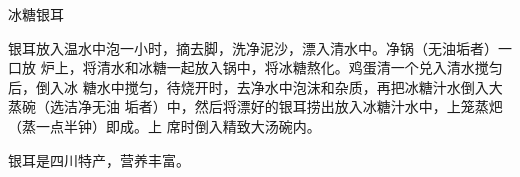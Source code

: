 \begin{recipe}{冰糖银耳}

\ingredients


\preparation

银耳放入温水中泡一小时，摘去脚，洗净泥沙，漂入清水中。净锅（无油垢者）一口放
炉上，将清水和冰糖一起放入锅中，将冰糖熬化。鸡蛋清一个兑入清水搅匀后，倒入冰
糖水中搅匀，待烧开时，去净水中泡沫和杂质，再把冰糖汁水倒入大蒸碗（选洁净无油
垢者）中，然后将漂好的银耳捞出放入冰糖汁水中，上笼蒸𤆵（蒸一点半钟）即成。上
席时倒入精致大汤碗内。

\features

银耳是四川特产，营养丰富。

\end{recipe}

